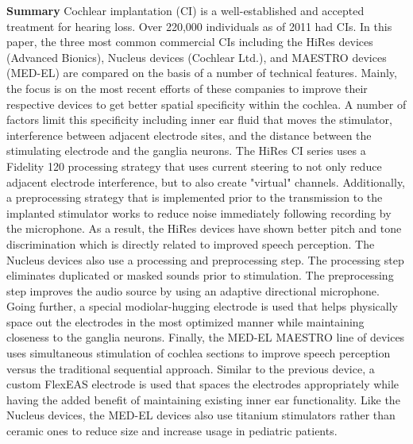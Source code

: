 \noindent
\textbf{Summary} Cochlear implantation (CI) is a well-established and accepted treatment for hearing loss. Over 220,000 individuals as of 2011 had CIs. In this paper, the three most common commercial CIs including the HiRes devices (Advanced Bionics), Nucleus devices (Cochlear Ltd.), and MAESTRO devices (MED-EL) are compared on the basis of a number of technical features. Mainly, the focus is on the most recent efforts of these companies to improve their respective devices to get better spatial specificity within the cochlea. A number of factors limit this specificity including inner ear fluid that moves the stimulator, interference between adjacent electrode sites, and the distance between the stimulating electrode and the ganglia neurons. The HiRes CI series uses a Fidelity 120 processing strategy that uses current steering to not only reduce adjacent electrode interference, but to also create "virtual" channels. Additionally, a preprocessing strategy that is implemented prior to the transmission to the implanted stimulator works to reduce noise immediately following recording by the microphone. As a result, the HiRes devices have shown better pitch and tone discrimination which is directly related to improved speech perception. The Nucleus devices also use a processing and preprocessing step. The processing step eliminates duplicated or masked sounds prior to stimulation. The preprocessing step improves the audio source by using an adaptive directional microphone. Going further, a special modiolar-hugging electrode is used that helps physically space out the electrodes in the most optimized manner while maintaining closeness to the ganglia neurons. Finally, the MED-EL MAESTRO line of devices uses simultaneous stimulation of cochlea sections to improve speech perception versus the traditional sequential approach. Similar to the previous device, a custom FlexEAS electrode is used that spaces the electrodes appropriately while having the added benefit of maintaining existing inner ear functionality. Like the Nucleus devices, the MED-EL devices also use titanium stimulators rather than ceramic ones to reduce size and increase usage in pediatric patients. \\ \\


